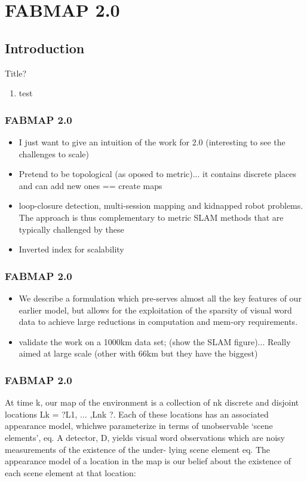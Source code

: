 \section{FABMAP 2.0}

\subsection{Introduction}
\begin{frame}{Title?}
   \begin{enumerate}
       \item test
   \end{enumerate} 
\end{frame}


\begin{frame}
    \frametitle{FABMAP 2.0}
    \begin{itemize}
        \item I just want to give an intuition of the work for 2.0 (interesting to see the challenges to scale)
        \item Pretend to be topological (as oposed to metric)... it contains discrete places and can add new ones == create maps
        \item loop-closure detection, multi-session mapping and kidnapped robot problems. The approach is thus complementary to metric SLAM methods that are typically challenged by these
        \item Inverted index for scalability
    \end{itemize}
\end{frame}

\begin{frame}
    \frametitle{FABMAP 2.0}
    \begin{itemize}
        \item We describe a formulation which pre-serves almost all the key features of our earlier model, but allows for the exploitation of the sparsity of visual word data to achieve large reductions in computation and mem-ory requirements.
        \item validate the work on a 1000km data set; (show the SLAM figure)... Really aimed at large scale (other with 66km but they have the biggest)
    \end{itemize}
\end{frame}

\begin{frame}
    \frametitle{FABMAP 2.0}
    At time k, our map of the environment is a collection of nk discrete and disjoint locations Lk = ?L1, ... ,Lnk ?. Each of these locations has an associated appearance model, whichwe parameterize in terms of unobservable ‘scene elements’, eq. A detector, D, yields visual word observations which are noisy measurements of the existence of the under- lying scene element eq. The appearance model of a location in the map is our belief about the existence of each scene element at that location:
\end{frame}

